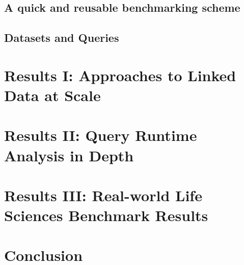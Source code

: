 \documentclass[twocolumn]{bmcart}%
\begin{document}
\subsection{A quick and reusable benchmarking scheme}
\label{subsec:bmscheme}


\subsection{Datasets and Queries}
\label{subsec:dataqueries}


%

\section{Results I: Approaches to Linked Data at Scale}
\label{sec:tradeoffs}


\section{Results II: Query Runtime Analysis in Depth}
\label{sec:runtimefactors}


\section{Results III: Real-world Life Sciences Benchmark Results}
\label{sec:realworld}


\section{Conclusion}




\end{document}
